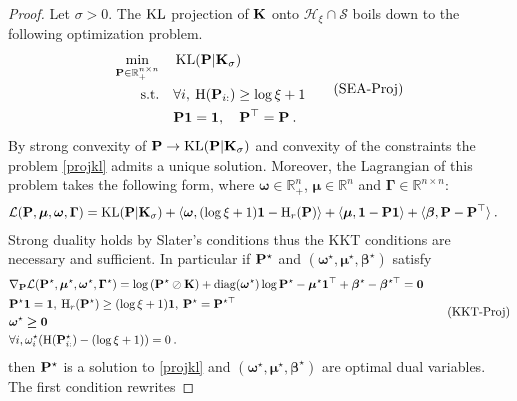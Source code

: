 \begin{proof}

Let $\sigma > 0$. The $\operatorname{KL}$ projection of $\mathbf{K}$ onto $\mathcal{H}_{\xi} \cap \mathcal{S}$ boils down to the following optimization problem.
\begin{equation}
\label{projkl}
\begin{split}
    \min_{{\mathbf{P}} \in \mathbb{R}_+^{n \times n}} \quad &\operatorname{KL}({\mathbf{P}} | \mathbf{K}_\sigma) \\
    \text{s.t.} \quad &\forall i, \: \operatorname{H}({\mathbf{P}}_{i:}) \geq \log{\xi} + 1 \\
    & {\mathbf{P}} \bm{1} = \bm{1}, \quad {\mathbf{P}}^\top = {\mathbf{P}} \:.
\end{split}
\tag{SEA-Proj}
\end{equation}
By strong convexity of ${\mathbf{P}} \rightarrow \operatorname{KL}({\mathbf{P}} | \mathbf{K}_\sigma)$ and convexity of the constraints the problem \eqref{projkl} admits a unique solution. Moreover, the Lagrangian of this problem takes the following form, where $\bm{\omega} \in \mathbb{R}_+^n$, $\bm{\mu} \in \mathbb{R}^n$ and $\bm{\Gamma} \in \mathbb{R}^{n \times n}$:
\begin{align*}
    \mathcal{L}({\mathbf{P}}, \bm{\mu}, \bm{\omega}, \bm{\Gamma}) &= \operatorname{KL}({\mathbf{P}} | \mathbf{K}_\sigma) + \langle \bm{\omega}, (\log{\xi} + 1) \bm{1} - \operatorname{H}_r({\mathbf{P}}) \rangle + \langle \bm{\mu}, \bm{1} - {\mathbf{P}} \bm{1} \rangle + \langle \bm{\beta}, {\mathbf{P}} - {\mathbf{P}}^\top \rangle \:.
\end{align*}
Strong duality holds by Slater's conditions thus the KKT conditions are necessary and sufficient. In particular if ${\mathbf{P}}^\star$ and $(\bm{\omega}^\star, \bm{\mu}^\star, \bm{\beta}^\star)$ satisfy
\begin{equation}
\label{kkt1}
\begin{split}
    &\nabla_{\mathbf{P}} \mathcal{L}({\mathbf{P}}^\star, \bm{\mu}^\star, \bm{\omega}^\star, \bm{\Gamma}^\star) = \log \left( {\mathbf{P}}^\star \oslash \mathbf{K} \right) + \operatorname{diag}(\bm{\omega}^\star)\log{{\mathbf{P}}^\star} - \bm{\mu}^\star \bm{1}^\top + \bm{\beta}^\star - \bm{\beta}^{\star\top} = \bm{0} \\
    &{\mathbf{P}}^\star \bm{1} = \bm{1}, \: \operatorname{H}_r({\mathbf{P}}^\star) \geq (\log{\xi} + 1)\bm{1}, \: {\mathbf{P}}^\star = {\mathbf{P}}^{\star \top} \\
    &\bm{\omega}^\star \bm{\geq} \bm{0} \\
    &\forall i, \omega_i^\star (\operatorname{H}({\mathbf{P}}_{i:}^\star) - (\log{\xi} + 1)) = 0\:.
\end{split}
\tag{KKT-Proj}
\end{equation}
then ${\mathbf{P}}^\star$ is a solution to \eqref{projkl} and $(\bm{\omega}^\star, \bm{\mu}^\star, \bm{\beta}^\star)$ are optimal dual variables. The first condition rewrites

\end{proof}
